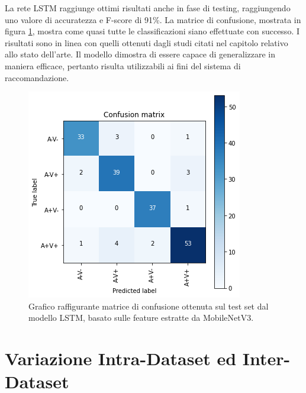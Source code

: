 \documentclass[11pt]{report}
\begin{document}
La rete LSTM raggiunge ottimi risultati anche in fase di testing, raggiungendo uno valore di accuratezza e F-score di 91\%. La matrice di confusione, mostrata in figura \ref{fig:LSTM-cm}, mostra come quasi tutte le classificazioni siano effettuate con successo. I risultati sono in linea con quelli ottenuti dagli studi citati nel capitolo relativo allo stato dell'arte. Il modello dimostra di essere capace di generalizzare in maniera efficace, pertanto risulta utilizzabili ai fini del sistema di raccomandazione.

\vspace{2cm}

\begin{figure}[h]
    \centering
    \includegraphics[scale=0.7]{img/confusion-matrix-lstm.png}
    \caption{Grafico raffigurante matrice di confusione ottenuta sul test set dal modello LSTM, basato sulle feature estratte da MobileNetV3.}
    \label{fig:LSTM-cm}
\end{figure}

\newpage

\section{Variazione Intra-Dataset ed Inter-Dataset}
\end{document}
